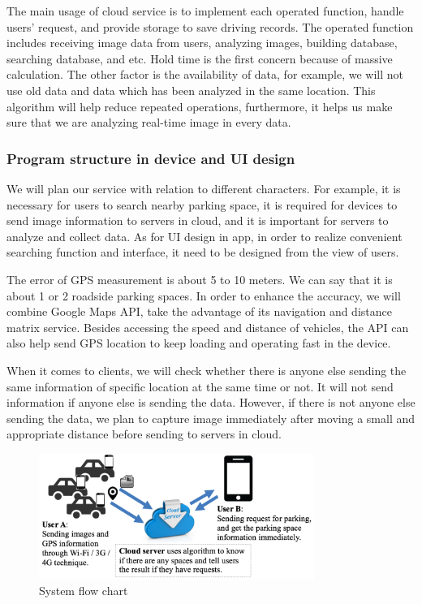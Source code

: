 \documentclass[runningheads,a4paper]{llncs}
\begin{document}
The main usage of cloud service is to implement each operated function,
handle users' request, and provide storage to save driving records. The
operated function includes receiving image data from users, analyzing
images, building database, searching database, and etc. Hold time is the
first concern because of massive calculation. The other factor is the
availability of data, for example, we will not use old data and data
which has been analyzed in the same location. This algorithm will help
reduce repeated operations, furthermore, it helps us make sure that we
are analyzing real-time image in every data.

%
\subsubsection{Program structure in device and UI design}
%

We will plan our service with relation to different characters. For
example, it is necessary for users to search nearby parking space, it is
required for devices to send image information to servers in cloud, and it
is important for servers to analyze and collect data. As for UI design
in app, in order to realize convenient searching function and interface,
it need to be designed from the view of users.

The error of GPS measurement is about 5 to 10 meters. We can say
that it is about 1 or 2 roadside parking spaces. In order to enhance the
accuracy, we will combine Google Maps API, take the advantage of its
navigation and distance matrix service. Besides accessing the speed and
distance of vehicles, the API can also help send GPS location to keep
loading and operating fast in the device.

When it comes to clients, we will check whether there is anyone else
sending the same information of specific location at the same time or
not. It will not send information if anyone else is sending the data.
However, if there is not anyone else sending the data, we plan to
capture image immediately after moving a small and appropriate distance
before sending to servers in cloud.

\begin{figure}[tbp]
	\centering
		\includegraphics[width=0.8\textwidth]{Figures/flowChart.png}
		\caption{System flow chart}
		\label{fig:system}
\end{figure}
\end{document}
